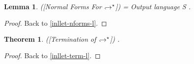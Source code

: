 \documentclass[a4paper,11pt,oneside]{article}
\theoremstyle{plain}
\newtheorem{lemma}[definition]{Lemma}
\newtheorem{theorem}[definition]{Theorem}
\newcommand{\tmlet}[3]{let~#1=#2~in~#3}
\newcommand{\tmsbst}[3]{#1 [#2 \mapsfrom #3] }
\newcommand{\inlT}{\mathcal{T}}
\newcommand{\hookdownarrow}{\mathrel{\rotatebox[origin=c]{180}{$\hookleftarrow$}}}
\newcommand{\inlletarr}{\hookdownarrow}
\newcommand{\inllet}[2]{#1 \hookdownarrow #2}
\begin{document}
%
%	
%
%	
%
	
	
\begin{lemma}([Normal Forms For $\inlletarr^\star$]) = Output language S
 \label{inllet-nforms-p}.
\end{lemma}
\begin{proof}
Back to \ref{inllet-nforms-l}.
\end{proof}


\begin{theorem}([Termination of $\inlletarr^\star$])
\label{inllet-term-p}.
\end{theorem}
\begin{proof}
  Back to \ref{inllet-term-l}.
\end{proof}	
	
\end{document}
